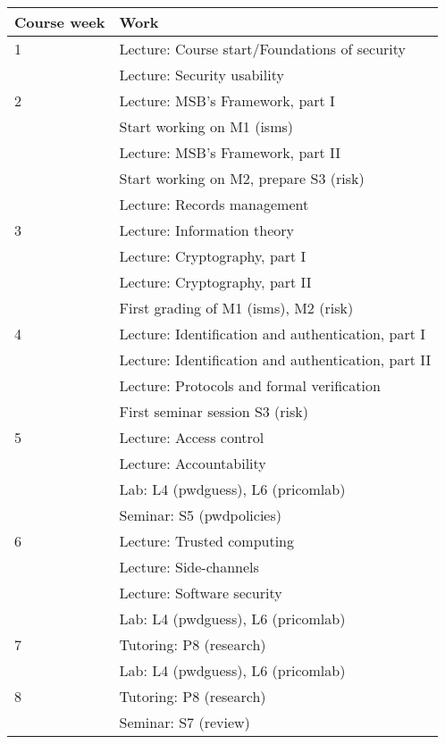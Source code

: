 \begin{table}
	\centering
  \begin{tabular}{lp{9cm}}
    \toprule
    \textbf{Course week}	& \textbf{Work} \\
    \midrule
    1
    & Lecture: Course start/Foundations of security\\
    & Lecture: Security usability\\
    \midrule
    2
    & Lecture: MSB's Framework, part I\\
    & Start working on M1 (isms)\\
    & Lecture: MSB's Framework, part II\\
    & Start working on M2, prepare S3 (risk)\\
    & Lecture: Records management\\
    \midrule
    3
    & Lecture: Information theory\\
    & Lecture: Cryptography, part I\\
    & Lecture: Cryptography, part II\\
    & First grading of M1 (isms), M2 (risk)\\
    \midrule
    4
    & Lecture: Identification and authentication, part I\\
    & Lecture: Identification and authentication, part II\\
    & Lecture: Protocols and formal verification\\
    & First seminar session S3 (risk)\\
    \midrule
    5
    & Lecture: Access control\\
    & Lecture: Accountability\\
    & Lab: L4 (pwdguess), L6 (pricomlab)\\
    & Seminar: S5 (pwdpolicies)\\
    \midrule
    6
    & Lecture: Trusted computing\\
    & Lecture: Side-channels\\
    & Lecture: Software security\\
    & Lab: L4 (pwdguess), L6 (pricomlab)\\
    \midrule
    7
    & Tutoring: P8 (research)\\
    & Lab: L4 (pwdguess), L6 (pricomlab)\\
    \midrule
    8
    & Tutoring: P8 (research)\\
    & Seminar: S7 (review)\\

\end{tabular}
\end{table}
